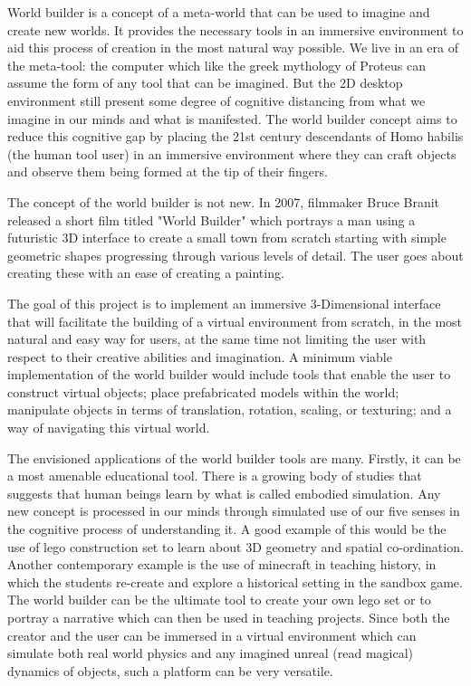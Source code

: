World builder is a concept of a meta-world that can be used to imagine and create new worlds. It provides the necessary tools in an immersive
environment to aid this process of creation in the most natural way possible. We live in an era of the meta-tool: the computer which like the greek 
mythology of Proteus can assume the form of any tool that can be imagined. But the 2D desktop environment still present some degree of cognitive 
distancing from what we imagine in our minds and what is manifested. The world builder concept aims to reduce this cognitive gap by placing the 21st century descendants of Homo habilis (the human tool user) in an immersive environment where they can craft objects and observe them being formed
at the tip of their fingers.


The concept of the world builder is not new. In 2007, filmmaker Bruce Branit released a short film titled "World Builder" \cite{video:WorldBuilder}
which portrays a man using a futuristic 3D interface to create a small town from scratch starting with simple geometric shapes progressing through
various levels of detail.  The user goes about creating these with an ease of creating a painting.


The goal of this project is to implement an immersive 3-Dimensional interface that will facilitate the building of a virtual environment from scratch, in
the most natural and easy way for users, at the same time not limiting the user with respect to their creative abilities and imagination. A 
minimum viable implementation of the world builder would include tools that enable the user to construct virtual objects; place prefabricated models 
within the world; manipulate objects in terms of translation, rotation, scaling, or texturing; and a way of navigating this virtual world.


The envisioned applications of the world builder tools are many. Firstly, it can be a most amenable educational tool. There is a growing body of studies 
that suggests that human beings learn by what is called embodied simulation. Any new concept is processed in our minds through simulated use of our five
senses in the cognitive process of understanding it. A good example of this would be the use of lego construction set to learn about 3D geometry and 
spatial co-ordination.  Another contemporary example is the use of minecraft in teaching history, in which the students re-create and explore a 
historical setting in the sandbox game. The world builder can be the ultimate tool to create your own lego set or to portray a narrative which can then
be used in teaching projects. Since both the creator and the user can be immersed in a virtual environment which can simulate both real world physics 
and any imagined unreal (read magical) dynamics of objects, such a platform can be very versatile. 


